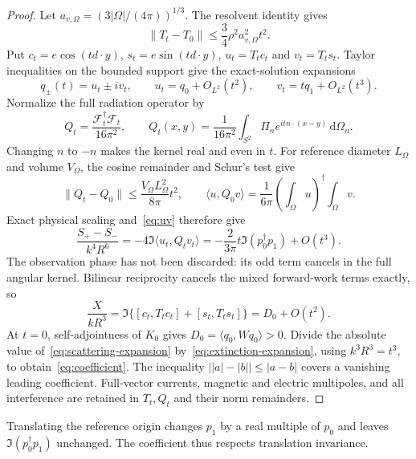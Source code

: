\documentclass[11pt]{article}
\newcommand{\dd}{\,\mathrm{d}}
\newcommand{\ip}[2]{\langle #1,#2\rangle}
\newcommand{\bilin}[2]{[#1,#2]}
\newcommand{\norm}[1]{\lVert #1\rVert}
\newcommand{\abs}[1]{\lvert #1\rvert}
\begin{document}
\begin{proof}
Let $a_{v,\Omega}=(3\abs\Omega/(4\pi))^{1/3}$. The resolvent identity gives
\begin{equation}\label{eq:resolvent-expansion}
 \norm{T_t-T_0}\leq\frac34\rho^2a_{v,\Omega}^2t^2.
\end{equation}
Put $c_t=e\cos(td\cdot y)$, $s_t=e\sin(td\cdot y)$, $u_t=T_tc_t$ and $v_t=T_ts_t$. Taylor inequalities on the bounded support give the exact-solution expansions
\begin{equation}\label{eq:uv}
 q_\pm(t)=u_t\pm iv_t,\qquad
 u_t=q_0+O_{L^2}(t^2),\qquad v_t=tq_1+O_{L^2}(t^3).
\end{equation}
Normalize the full radiation operator by
\begin{equation}\label{eq:Q}
 Q_t=\frac{\mathcal F_t^\dagger\mathcal F_t}{16\pi^2},\qquad
 Q_t(x,y)=\frac1{16\pi^2}\int_{S^2}\Pi_n e^{itn\cdot(x-y)}\dd\Omega_n.
\end{equation}
Changing $n$ to $-n$ makes the kernel real and even in $t$. For reference diameter $L_\Omega$ and volume $V_\Omega$, the cosine remainder and Schur's test give
\begin{equation}\label{eq:Q-bound}
 \norm{Q_t-Q_0}\leq\frac{V_\Omega L_\Omega^2}{8\pi}t^2,
 \qquad \ip{u}{Q_0v}=\frac1{6\pi}
 \left(\int_\Omega u\right)^\dagger\int_\Omega v.
\end{equation}
Exact physical scaling and~\eqref{eq:uv} therefore give
\begin{equation}\label{eq:scattering-expansion}
 \frac{S_+-S_-}{k^4R^6}
 =-4\Im\ip{u_t}{Q_tv_t}
 =-\frac{2}{3\pi}t\Im(p_0^\dagger p_1)+O(t^3).
\end{equation}
The observation phase has not been discarded: its odd term cancels in the full angular kernel. Bilinear reciprocity cancels the mixed forward-work terms exactly, so
\begin{equation}\label{eq:extinction-expansion}
 \frac{X}{kR^3}=\Im\{\bilin{c_t}{T_tc_t}+\bilin{s_t}{T_ts_t}\}
 =D_0+O(t^2).
\end{equation}
At $t=0$, self-adjointness of $K_0$ gives $D_0=\ip{q_0}{Wq_0}>0$. Divide the absolute value of~\eqref{eq:scattering-expansion} by~\eqref{eq:extinction-expansion}, using $k^3R^3=t^3$, to obtain~\eqref{eq:coefficient}. The inequality $\abs{\abs a-\abs b}\leq\abs{a-b}$ covers a vanishing leading coefficient. Full-vector currents, magnetic and electric multipoles, and all interference are retained in $T_t,Q_t$ and their norm remainders.
\end{proof}
Translating the reference origin changes $p_1$ by a real multiple of $p_0$ and leaves $\Im(p_0^\dagger p_1)$ unchanged. The coefficient thus respects translation invariance.
\end{document}
